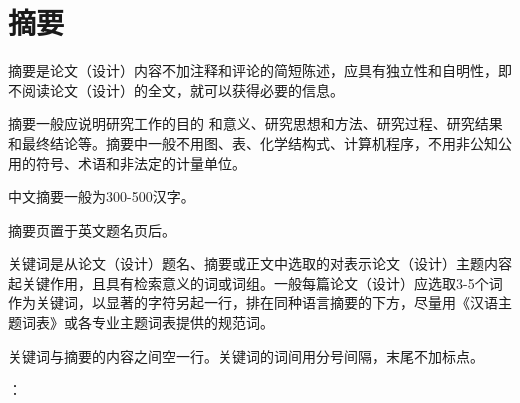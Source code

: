 \clearpage
{}

{}

\section*{摘\quad 要}

摘要是论文（设计）内容不加注释和评论的简短陈述，应具有独立性和自明性，即不阅读论文（设计）的全文，就可以获得必要的信息。\par 
摘要一般应说明研究工作的目的 和意义、研究思想和方法、研究过程、研究结果和最终结论等。摘要中一般不用图、表、化学结构式、计算机程序，不用非公知公用的符号、术语和非法定的计量单位。\par 
中文摘要一般为300-500汉字。\par 
摘要页置于英文题名页后。 \par 
关键词是从论文（设计）题名、摘要或正文中选取的对表示论文（设计）主题内容起关键作用，且具有检索意义的词或词组。一般每篇论文（设计）应选取3-5个词作为关键词，以显著的字符另起一行，排在同种语言摘要的下方，尽量用《汉语主题词表》或各专业主题词表提供的规范词。\par 
关键词与摘要的内容之间空一行。关键词的词间用分号间隔，末尾不加标点。

\vspace{20pt}

：\cquKeywordsCN
